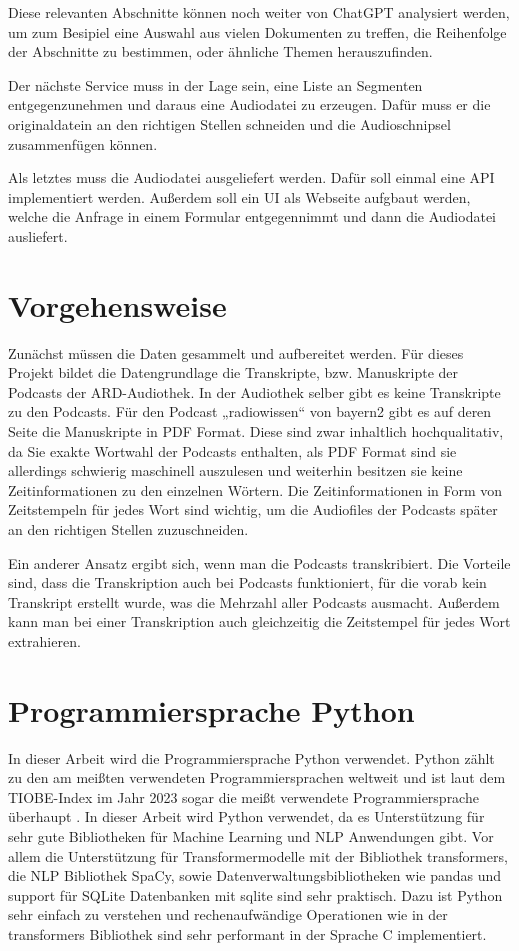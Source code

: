 Diese relevanten Abschnitte können noch weiter von ChatGPT analysiert werden, um zum Besipiel eine Auswahl aus vielen Dokumenten zu treffen, die Reihenfolge der Abschnitte zu bestimmen, oder ähnliche Themen herauszufinden.

Der nächste Service muss in der Lage sein, eine Liste an Segmenten entgegenzunehmen und daraus eine Audiodatei zu erzeugen.
Dafür muss er die originaldatein an den richtigen Stellen schneiden und die Audioschnipsel zusammenfügen können.

Als letztes muss die Audiodatei ausgeliefert werden. 
Dafür soll einmal eine API implementiert werden.
Außerdem soll ein UI als Webseite aufgbaut werden, welche die Anfrage in einem Formular entgegennimmt und dann die Audiodatei ausliefert.


\section{Vorgehensweise}


Zunächst müssen die Daten gesammelt und aufbereitet werden. 
Für dieses Projekt bildet die Datengrundlage die Transkripte, bzw. Manuskripte der Podcasts der ARD-Audiothek. 
In der Audiothek selber gibt es keine Transkripte zu den Podcasts. 
Für den Podcast „radiowissen“ von bayern2 gibt es auf deren Seite die Manuskripte in PDF Format. 
Diese sind zwar inhaltlich hochqualitativ, da Sie exakte Wortwahl der Podcasts enthalten, als PDF Format sind sie allerdings schwierig maschinell auszulesen und weiterhin besitzen sie keine Zeitinformationen zu den einzelnen Wörtern. 
Die Zeitinformationen in Form von Zeitstempeln für jedes Wort sind wichtig, um die Audiofiles der Podcasts später an den richtigen Stellen zuzuschneiden. 

Ein anderer Ansatz ergibt sich, wenn man die Podcasts transkribiert. 
Die Vorteile sind, dass die Transkription auch bei Podcasts funktioniert, für die vorab kein Transkript erstellt wurde, was die Mehrzahl aller Podcasts ausmacht. 
Außerdem kann man bei einer Transkription auch gleichzeitig die Zeitstempel für jedes Wort extrahieren.

\section{Programmiersprache Python}

In dieser Arbeit wird die Programmiersprache Python verwendet.
Python zählt zu den am meißten verwendeten Programmiersprachen weltweit und ist laut dem TIOBE-Index im Jahr 2023 sogar die meißt verwendete Programmiersprache überhaupt \cite{index2023}.
In dieser Arbeit wird Python verwendet, da es Unterstützung für sehr gute Bibliotheken für Machine Learning und NLP Anwendungen gibt.
Vor allem die Unterstützung für Transformermodelle mit der Bibliothek transformers, die NLP Bibliothek SpaCy, sowie Datenverwaltungsbibliotheken wie pandas und support für SQLite Datenbanken mit sqlite sind sehr praktisch.
Dazu ist Python sehr einfach zu verstehen und rechenaufwändige Operationen wie in der transformers Bibliothek sind sehr performant in der Sprache C implementiert.


